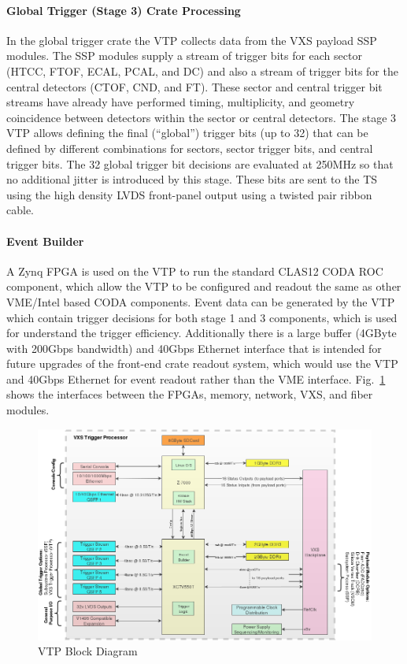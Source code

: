 \paragraph{Global Trigger (Stage 3) Crate Processing}
In the global trigger crate the VTP collects data from the VXS payload SSP modules. The SSP modules supply a stream of trigger bits for each sector (HTCC, FTOF, ECAL, PCAL, and DC) and also a stream of trigger bits for the central detectors (CTOF, CND, and FT). These sector and central trigger bit streams have already have performed timing, multiplicity, and geometry coincidence between detectors within the sector or central detectors. The stage 3 VTP allows defining the final (``global'') trigger bits (up to 32) that can be defined by different combinations for sectors, sector trigger bits, and central trigger bits. The 32 global trigger bit decisions are evaluated at 250MHz so that no additional jitter is introduced by this stage. These bits are sent to the TS using the high density LVDS front-panel output using a twisted pair ribbon cable.

\paragraph{Event Builder}
A Zynq FPGA is used on the VTP to run the standard CLAS12 CODA ROC component, which allow the VTP to be configured and readout the same as other VME/Intel based CODA components. Event data can be generated by the VTP which contain trigger decisions for both stage 1 and 3 components, which is used for understand the trigger efficiency. Additionally there is a large buffer (4GByte with 200Gbps bandwidth) and 40Gbps Ethernet interface that is intended for future upgrades of the front-end crate readout system, which would use the VTP and 40Gbps Ethernet for event readout rather than the VME interface. Fig.~\ref{fig:vtp_block_daq} shows the interfaces between the FPGAs, memory, network, VXS, and fiber modules.

\begin{figure}[hbt]
	\centering
	\includegraphics[width=1.0\columnwidth,keepaspectratio]{img/vtp_block_daq.png}
	\caption{VTP Block Diagram}
	\label{fig:vtp_block_daq}
\end{figure}


